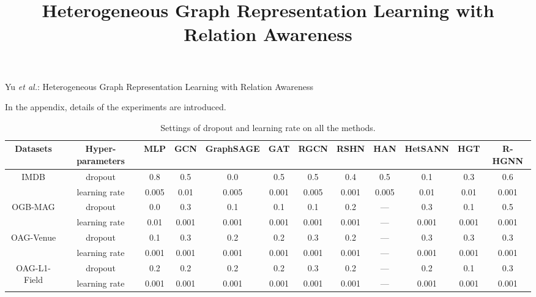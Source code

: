 \documentclass[10pt,journal,compsoc]{IEEEtran}
\begin{document}
\title{Heterogeneous Graph Representation Learning with Relation Awareness}









{Yu \MakeLowercase{\textit{et al.}}: Heterogeneous Graph Representation Learning with Relation Awareness}


\appendix
\label{section-appendix}
In the appendix, details of the experiments are introduced.

\begin{table*}[!htbp]
\centering
\caption{Settings of dropout and learning rate on all the methods.}
\label{tab:hyperparameters}
\begin{tabular}{c|c|cccccccccc}
\hline
Datasets                      & Hyper-parameters & MLP   & GCN   & GraphSAGE & GAT   & RGCN  & RSHN  & HAN   & HetSANN & HGT   & R-HGNN \\ \hline
\multirow{2}{*}{IMDB}         & dropout          & 0.8   & 0.5   & 0.0       & 0.5   & 0.5   & 0.4   & 0.5   & 0.1     & 0.3   & 0.6     \\ 
                              & learning rate    & 0.005 & 0.01  & 0.005     & 0.001 & 0.005 & 0.001 & 0.005 & 0.01    & 0.01  & 0.001   \\ \hline
\multirow{2}{*}{OGB-MAG}      & dropout          & 0.0   & 0.3   & 0.1       & 0.1   & 0.1   & 0.2   & ---   & 0.3     & 0.1   & 0.5     \\ 
                              & learning rate    & 0.01  & 0.001 & 0.001     & 0.001 & 0.001 & 0.001 & ---   & 0.001   & 0.001 & 0.001   \\ \hline
\multirow{2}{*}{OAG-Venue}    & dropout          & 0.1   & 0.3   & 0.2       & 0.2   & 0.3   & 0.2   & ---   & 0.3     & 0.3   & 0.3     \\
                              & learning rate    & 0.001 & 0.001 & 0.001     & 0.001 & 0.001 & 0.001 & ---   & 0.001   & 0.001 & 0.001   \\ \hline
\multirow{2}{*}{OAG-L1-Field} & dropout          & 0.2   & 0.2   & 0.2       & 0.2   & 0.3   & 0.2   & ---   & 0.2     & 0.1   & 0.3     \\ 
                              & learning rate    & 0.001 & 0.001 & 0.001     & 0.001 & 0.001 & 0.001 & ---   & 0.001   & 0.001 & 0.001   \\ \hline
\end{tabular}
\end{table*}
\end{document}
